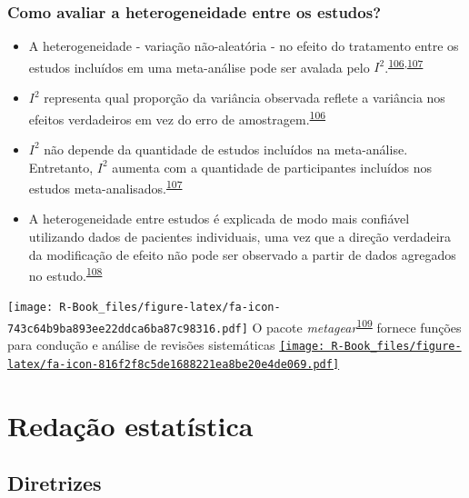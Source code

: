 \documentclass[
]{book}
\begin{document}
\hypertarget{como-avaliar-a-heterogeneidade-entre-os-estudos}{%
\subsection{Como avaliar a heterogeneidade entre os estudos?}\label{como-avaliar-a-heterogeneidade-entre-os-estudos}}

\begin{itemize}
\item
  A heterogeneidade - variação não-aleatória - no efeito do tratamento entre os estudos incluídos em uma meta-análise pode ser avalada pelo \(I^{2}\).\textsuperscript{\protect\hyperlink{ref-Borenstein2022}{106},\protect\hyperlink{ref-Ruxfccker2008}{107}}
\item
  \(I^{2}\) representa qual proporção da variância observada reflete a variância nos efeitos verdadeiros em vez do erro de amostragem.\textsuperscript{\protect\hyperlink{ref-Borenstein2022}{106}}
\item
  \(I^{2}\) não depende da quantidade de estudos incluídos na meta-análise. Entretanto, \(I^{2}\) aumenta com a quantidade de participantes incluídos nos estudos meta-analisados.\textsuperscript{\protect\hyperlink{ref-Ruxfccker2008}{107}}
\item
  A heterogeneidade entre estudos é explicada de modo mais confiável utilizando dados de pacientes individuais, uma vez que a direção verdadeira da modificação de efeito não pode ser observado a partir de dados agregados no estudo.\textsuperscript{\protect\hyperlink{ref-degrooth2023}{108}}
\end{itemize}

\texttt{[image: R-Book\_files/figure-latex/fa-icon-743c64b9ba893ee22ddca6ba87c98316.pdf]} O pacote \emph{metagear}\textsuperscript{\protect\hyperlink{ref-metagear}{109}} fornece funções para condução e análise de revisões sistemáticas \href{https://cran.r-project.org/web/packages/metagear/index.html}{\texttt{[image: R-Book\_files/figure-latex/fa-icon-816f2f8c5de1688221ea8be20e4de069.pdf]}}

\hypertarget{redacao}{%
\chapter{\texorpdfstring{\textbf{Redação estatística}}{Redação estatística}}\label{redacao}}

\hypertarget{diretrizes}{%
\section{Diretrizes}\label{diretrizes}}
\end{document}
